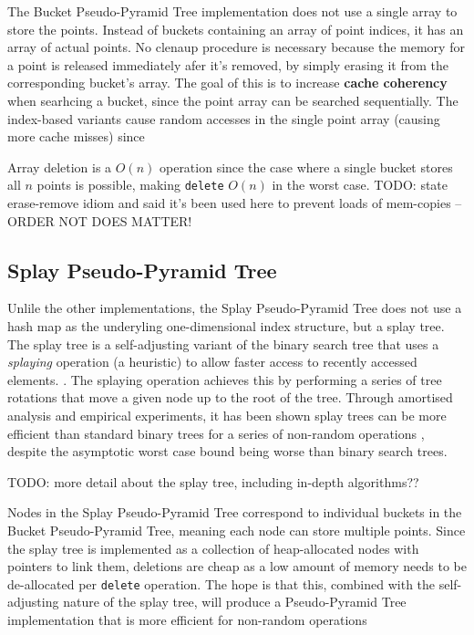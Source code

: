 The Bucket Pseudo-Pyramid Tree implementation does not use a single array to store the points. Instead of buckets containing an array of point indices, it has an array of actual points. No clenaup procedure is necessary because the memory for a point is released immediately afer it's removed, by simply erasing it from the corresponding bucket's array. The goal of this is to increase \textbf{cache coherency} when searhcing a bucket, since the point array can be searched sequentially. The index-based variants cause random accesses in the single point array (causing more cache misses) since 

Array deletion is a $O(n)$ operation since the case where a single bucket stores all $n$ points is possible, making \texttt{delete} $O(n)$ in the worst case. TODO: state erase-remove idiom and said it's been used here to prevent loads of mem-copies -- ORDER NOT DOES MATTER!

\subsection{Splay Pseudo-Pyramid Tree}

Unlile the other implementations, the Splay Pseudo-Pyramid Tree does not use a hash map as the underyling one-dimensional index structure, but a splay tree. The splay tree is a self-adjusting variant of the binary search tree that uses a \textit{splaying} operation (a heuristic) to allow faster access to recently accessed elements. \cite{splay-tree}. The splaying operation achieves this by performing a series of tree rotations that move a given node up to the root of the tree. Through amortised analysis and empirical experiments, it has been shown splay trees can be more efficient than standard binary trees for a series of non-random operations \cite{splay-tree, TODO}, despite the asymptotic worst case bound being worse than binary search trees.

TODO: more detail about the splay tree, including in-depth algorithms??

Nodes in the Splay Pseudo-Pyramid Tree correspond to individual buckets in the Bucket Pseudo-Pyramid Tree, meaning each node can store multiple points. Since the splay tree is implemented as a collection of heap-allocated nodes with pointers to link them, deletions are cheap as a low amount of memory needs to be de-allocated per \texttt{delete} operation. The hope is that this, combined with the self-adjusting nature of the splay tree, will produce a Pseudo-Pyramid Tree implementation that is more efficient for non-random operations

